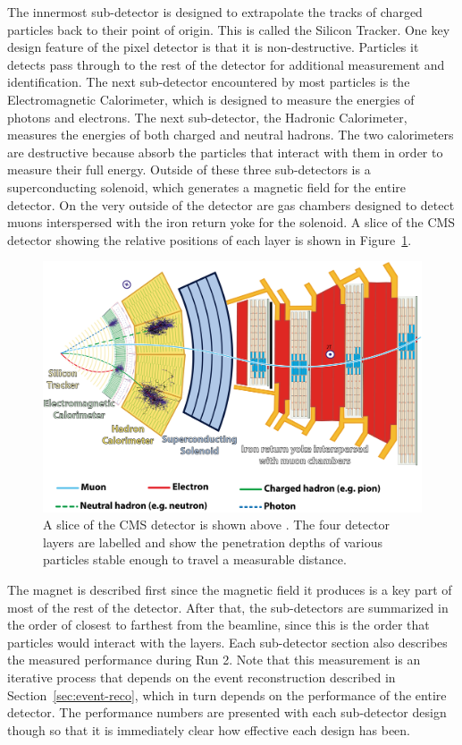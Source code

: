 The innermost sub-detector is designed to extrapolate the tracks of charged particles
back to their point of origin.
This is called the Silicon Tracker.
One key design feature of the pixel detector is that it is non-destructive.
Particles it detects pass through to the rest of the detector for additional
measurement and identification.
The next sub-detector encountered by most particles is the Electromagnetic Calorimeter,
which is designed to measure the energies of photons and electrons.
The next sub-detector, the Hadronic Calorimeter,
measures the energies of both charged and neutral hadrons.
The two calorimeters are destructive because absorb the particles that interact with them
in order to measure their full energy.
Outside of these three sub-detectors is a superconducting solenoid,
which generates a magnetic field for the entire detector.
On the very outside of the detector are gas chambers designed to detect muons
interspersed with the iron return yoke for the solenoid.
A slice of the CMS detector showing the relative positions of each layer
is shown in Figure~\ref{fig:slice}.
\begin{figure}
  \centering
  \includegraphics[width=0.9\linewidth]{figures/CMSslice_whiteBackground.png}
  \caption[CMS detector slice]{
    A slice of the CMS detector is shown above \cite{Barney:2120661}.
    The four detector layers are labelled and show the penetration
    depths of various particles stable enough to travel a measurable distance.
    }
  \label{fig:slice}
\end{figure}

The magnet is described first since the magnetic field it produces is a key
part of most of the rest of the detector.
After that, the sub-detectors are summarized in the order of closest to farthest
from the beamline, since this is the order that particles would interact with the layers.
Each sub-detector section also describes the measured performance during Run 2.
Note that this measurement is an iterative process that depends on the event reconstruction
described in Section~\ref{sec:event-reco},
which in turn depends on the performance of the entire detector.
The performance numbers are presented with each sub-detector design though so that
it is immediately clear how effective each design has been.

